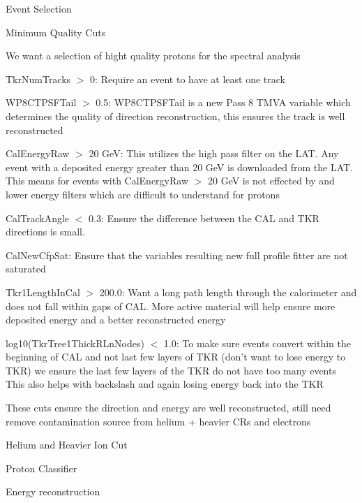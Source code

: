 \documentclass{article}
\begin{document}
\begin{myEnumerate}
\begin{myEnumerate}
			\end{myEnumerate}
		\item Event Selection
			\begin{myEnumerate}
				\item Minimum Quality Cuts
				\begin{myEnumerate}
					\item We want a selection of hight quality protons for the spectral analysis
					\item TkrNumTracks $>$ 0: Require an event to have at least one track
					\item WP8CTPSFTail $>$ 0.5: WP8CTPSFTail is a new Pass 8 TMVA variable which determines the quality of direction reconstruction, this ensures the track is well reconstructed
					\item CalEnergyRaw $>$ 20 GeV: This utilizes the high pass filter on the LAT.  Any event with a deposited energy greater than 20 GeV is downloaded from the LAT.  This means for events with CalEnergyRaw $>$ 20 GeV is not effected by and lower energy filters which are difficult to understand for protons
					\item CalTrackAngle $<$ 0.3: Ensure the difference between the CAL and TKR directions is small.
					\item CalNewCfpSat: Ensure that the variables resulting new full profile fitter are not saturated
					\item Tkr1LengthInCal $>$ 200.0: Want a long path length through the calorimeter and does not fall within gaps of CAL.  More active material will help ensure more deposited energy and a better reconstructed energy
					\item log10(TkrTree1ThickRLnNodes) $<$ 1.0: To make sure events convert within the beginning of CAL and not last few layers of TKR (don't want to lose energy to TKR) we ensure the last few layers of the TKR do not have too many events  This also helps with backslash and again losing energy back into the TKR
					\item These cuts ensure the direction and energy are well reconstructed, still need remove contamination source from helium + heavier CRs and electrons
				\end{myEnumerate}
				\item Helium and Heavier Ion Cut
				\item Proton Classifier
			\end{myEnumerate}
		\item Energy reconstruction
			\begin{myEnumerate}
				\item 
			\end{myEnumerate}
	\end{myEnumerate}
\end{document}

